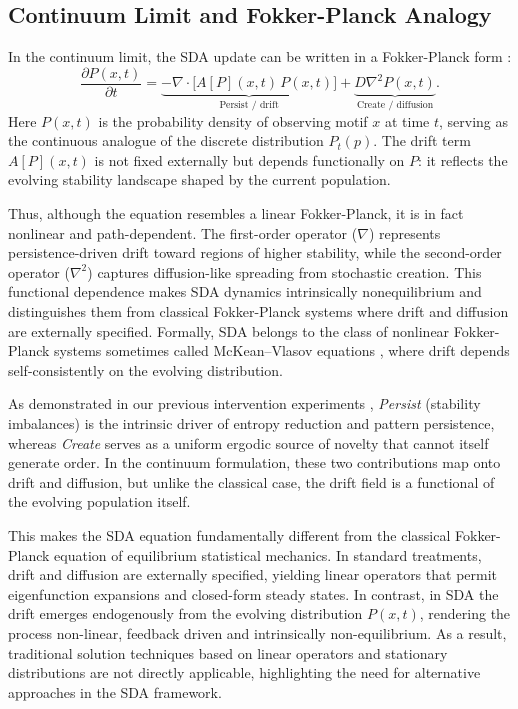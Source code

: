 \documentclass[life,article,submit,pdftex,moreauthors]{Definitions/mdpi}
\begin{document}
\subsection{Continuum Limit and Fokker-Planck Analogy}

In the continuum limit, the SDA update can be written in a Fokker-Planck form \cite{gardiner2009}:
\begin{equation}
\frac{\partial P(x,t)}{\partial t}
= \underbrace{- \nabla \cdot \big[ A[P](x,t)\, P(x,t) \big]}_{\text{Persist / drift}}
+ \underbrace{D \nabla^2 P(x,t)}_{\text{Create / diffusion}}.
\end{equation}
Here $P(x,t)$ is the probability density of observing motif $x$ at time $t$, 
serving as the continuous analogue of the discrete distribution $P_t(p)$. 
The drift term $A[P](x,t)$ is not fixed externally but depends functionally on $P$: 
it reflects the evolving stability landscape shaped by the current population. 

Thus, although the equation resembles a linear Fokker-Planck, it is in fact nonlinear and path-dependent. 
The first-order operator ($\nabla$) represents persistence-driven drift toward regions of higher stability, 
while the second-order operator ($\nabla^2$) captures diffusion-like spreading from stochastic creation. 
This functional dependence makes SDA dynamics intrinsically nonequilibrium and distinguishes them from 
classical Fokker-Planck systems where drift and diffusion are externally specified. 
Formally, SDA belongs to the class of nonlinear Fokker-Planck systems sometimes called McKean--Vlasov equations \cite{mckean1966, villani2009}, 
where drift depends self-consistently on the evolving distribution.  

As demonstrated in our previous intervention experiments \cite{adler_sda}, 
\textit{Persist} (stability imbalances) is the intrinsic driver of entropy
reduction and pattern persistence, whereas \textit{Create} serves as a uniform ergodic source of novelty that cannot itself generate order.  
In the continuum formulation, these two contributions map onto drift and diffusion, 
but unlike the classical case, the drift field is a functional of the evolving
population itself.  

This makes the SDA equation fundamentally different from the classical Fokker-Planck equation of equilibrium statistical mechanics. In standard treatments, 
drift and diffusion are externally specified, yielding linear operators that
permit eigenfunction expansions and closed-form steady states. In contrast,
in SDA the drift emerges endogenously from the evolving distribution $P(x,t)$, 
rendering the process non-linear, feedback driven and intrinsically non-equilibrium.  
As a result, traditional solution techniques based on linear operators and
stationary distributions are not directly applicable, highlighting the need
for alternative approaches in the SDA framework.
\end{document}
